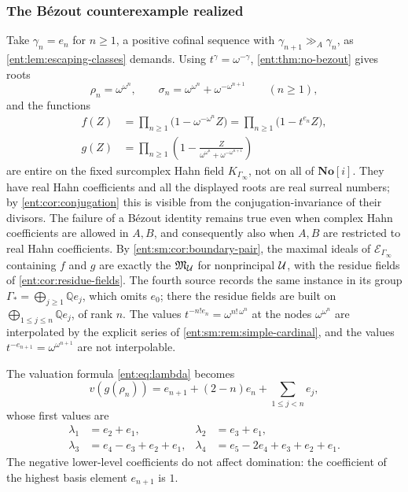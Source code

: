 \documentclass[11pt]{article}
\theoremstyle{plain}
\theoremstyle{plain}
\theoremstyle{plain}
\theoremstyle{definition}
\theoremstyle{definition}
\theoremstyle{definition}
\theoremstyle{definition}
\theoremstyle{remark}
\newcommand{\Q}{\mathbb Q}\newcommand{\Z}{\mathbb Z}\newcommand{\N}{\mathbb N}
\newcommand{\No}{\mathbf{No}}
\newcommand{\ggA}{\mathrel{\gg_{\!A}}}
\begin{document}
\subsubsection*{The B\'ezout counterexample realized}
Take $\gamma_n=e_n$ for $n\ge1$, a positive cofinal sequence with
$\gamma_{n+1}\ggA\gamma_n$, as \cref{ent:lem:escaping-classes} demands.
Using $t^\gamma=\omega^{-\gamma}$, \cref{ent:thm:no-bezout} gives roots
\begin{equation}\label{ent:eq:surreal-roots}
 \rho_n=\omega^{\omega^n},\qquad
 \sigma_n=\omega^{\omega^n}+\omega^{-\omega^{n+1}}
 \qquad(n\ge1),
\end{equation}
and the functions
\begin{align}
 f(Z)&=\prod_{n\ge1}\bigl(1-\omega^{-\omega^n}Z\bigr)
      =\prod_{n\ge1}\bigl(1-t^{e_n}Z\bigr),
      \label{ent:eq:f-explicit}\\
 g(Z)&=\prod_{n\ge1}\left(
 1-\frac{Z}{\omega^{\omega^n}+\omega^{-\omega^{n+1}}}\right)
\end{align}
are entire on the fixed surcomplex Hahn field $K_{\Gamma_\infty}$, not on all
of $\No[i]$. They have real Hahn coefficients and all the displayed roots are
real surreal numbers; by \cref{ent:cor:conjugation} this is visible from the
conjugation-invariance of their divisors. The failure of a B\'ezout identity
remains true even when complex Hahn coefficients are allowed in $A,B$, and
consequently also when $A,B$ are restricted to real Hahn coefficients. By
\cref{ent:sm:cor:boundary-pair}, the maximal ideals of
$\mathcal E_{\Gamma_\infty}$ containing $f$ and $g$ are exactly the
$\mathfrak M_\mathcal U$ for nonprincipal $\mathcal U$, with the residue fields of
\cref{ent:cor:residue-fields}. The fourth source records the same instance
in its group $\Gamma_*=\bigoplus_{j\ge1}\Q e_j$, which omits $e_0$; there
the residue fields are built on $\bigoplus_{1\le j\le n}\Q e_j$, of rank $n$.
The values $t^{-n!e_n}=\omega^{n!\,\omega^n}$ at the nodes $\omega^{\omega^n}$
are interpolated by the explicit series of
\cref{ent:sm:rem:simple-cardinal}, and the values
$t^{-e_{n+1}}=\omega^{\omega^{n+1}}$ are not interpolable.

The valuation formula \eqref{ent:eq:lambda} becomes
\[
 v(g(\rho_n))=e_{n+1}+(2-n)e_n+\sum_{1\le j<n}e_j,
\]
whose first values are
\begin{align*}
 \lambda_1&=e_2+e_1, & \lambda_2&=e_3+e_1,\\
 \lambda_3&=e_4-e_3+e_2+e_1,
 &\lambda_4&=e_5-2e_4+e_3+e_2+e_1.
\end{align*}
The negative lower-level coefficients do not affect domination: the
coefficient of the highest basis element $e_{n+1}$ is $1$.
\end{document}
